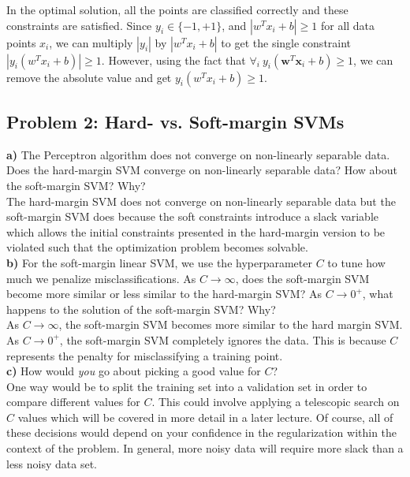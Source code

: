 \documentclass[a4paper]{article}
\begin{document}
In the optimal solution, all the points are classified correctly and these constraints are satisfied. Since $y_i \in \{-1,+1\}$, and $|w^Tx_i+b| \geq 1$ for all data points $x_i$, we can multiply $|y_i|$ by $|w^Tx_i+b|$ to get the single constraint $|y_i(w^Tx_i+b)| \geq 1$. However, using the fact that $\forall_i \ y_{i}(\mathbf{w}^T \mathbf{x}_{i}+b) \geq 1$, we can remove the absolute value and get $y_i(w^Tx_i+b) \geq 1$.\\

\subsection*{Problem 2: Hard- vs. Soft-margin SVMs}
\textbf{a)} The Perceptron algorithm does not converge on non-linearly separable data. Does the hard-margin SVM converge on non-linearly separable data? How about the soft-margin SVM? Why?\\

The hard-margin SVM does not converge on non-linearly separable data but the soft-margin SVM does because the soft constraints introduce a slack variable which allows the initial constraints presented in the hard-margin version to be violated such that the optimization problem becomes solvable. \\

\textbf{b)} For the soft-margin linear SVM, we use the hyperparameter $C$ to tune how much we penalize misclassifications. As $C\rightarrow\infty$, does the soft-margin SVM become more similar or less similar to the hard-margin SVM? As $C\rightarrow 0^+$, what happens to the solution of the soft-margin SVM? Why?\\

As $C\rightarrow\infty$, the soft-margin SVM becomes more similar to the hard margin SVM. As $C\rightarrow0^+$, the soft-margin SVM completely ignores the data. This is because $C$ represents the penalty for misclassifying a training point. \\

\textbf{c)} How would \textit{you} go about picking a good value for $C$? \\

One way would be to split the training set into a validation set in order to compare different values for $C$. This could involve applying a telescopic search on $C$ values which will be covered in more detail in a later lecture. Of course, all of these decisions would depend on your confidence in the regularization within the context of the problem. In general, more noisy data will require more slack than a less noisy data set.\\
\end{document}
